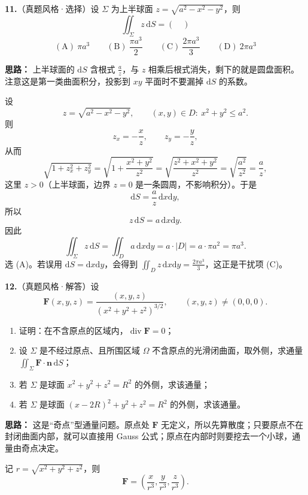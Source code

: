 \else \answerarea[8] \fi%

\textbf{11.}（真题风格·选择）设 $\Sigma$ 为上半球面 $z=\sqrt{a^2-x^2-y^2}$，则
\[
\iint_\Sigma z\,\mathrm{d}S=(\quad)
\]
\[
\mathrm{(A)}\ \pi a^3
\qquad
\mathrm{(B)}\ \frac{\pi a^3}{2}
\qquad
\mathrm{(C)}\ \frac{2\pi a^3}{3}
\qquad
\mathrm{(D)}\ 2\pi a^3
\]

\ifshowsolutions%
\textbf{思路：} 上半球面的 $\mathrm{d}S$ 含根式 $\frac{a}{z}$，与 $z$ 相乘后根式消失，剩下的就是圆盘面积。注意这是第一类曲面积分，投影到 $xy$ 平面时不要漏掉 $\mathrm{d}S$ 的系数。

设
\[
z=\sqrt{a^2-x^2-y^2},\qquad (x,y)\in D:\ x^2+y^2\le a^2.
\]
则
\[
z_x=-\frac{x}{z},\qquad z_y=-\frac{y}{z},
\]
从而
\[
\sqrt{1+z_x^2+z_y^2}
=\sqrt{1+\frac{x^2+y^2}{z^2}}
=\sqrt{\frac{z^2+x^2+y^2}{z^2}}
=\sqrt{\frac{a^2}{z^2}}
=\frac{a}{z},
\]
这里 $z>0$（上半球面，边界 $z=0$ 是一条圆周，不影响积分）。于是
\[
\mathrm{d}S=\frac{a}{z}\,\mathrm{d}x\mathrm{d}y,
\]
所以
\[
z\,\mathrm{d}S=a\,\mathrm{d}x\mathrm{d}y.
\]
因此
\[
\iint_\Sigma z\,\mathrm{d}S
=\iint_D a\,\mathrm{d}x\mathrm{d}y
=a\cdot |D|
=a\cdot\pi a^2
=\pi a^3.
\]
选 (A)。若误用 $\mathrm{d}S=\mathrm{d}x\mathrm{d}y$，会得到 $\iint_D z\,\mathrm{d}x\mathrm{d}y=\frac{2\pi a^3}{3}$，这正是干扰项 (C)。


\else \answerarea[8] \fi%

\textbf{12.}（真题风格·解答）设
\[
\mathbf F(x,y,z)=\frac{(x,y,z)}{(x^2+y^2+z^2)^{3/2}},
\qquad (x,y,z)\ne(0,0,0).
\]
\begin{enumerate}
  \item[(1)] 证明：在不含原点的区域内，$\operatorname{div}\mathbf F=0$；
  \item[(2)] 设 $\Sigma$ 是不经过原点、且所围区域 $\Omega$ 不含原点的光滑闭曲面，取外侧，求通量 $\displaystyle\iint_\Sigma \mathbf F\cdot\mathbf n\,\mathrm{d}S$；
  \item[(3)] 若 $\Sigma$ 是球面 $x^2+y^2+z^2=R^2$ 的外侧，求该通量；
  \item[(4)] 若 $\Sigma$ 是球面 $(x-2R)^2+y^2+z^2=R^2$ 的外侧，求该通量。
\end{enumerate}

\ifshowsolutions%
\textbf{思路：} 这是“奇点”型通量问题。原点处 $\mathbf F$ 无定义，所以先算散度；只要原点不在封闭曲面内部，就可以直接用 Gauss 公式；原点在内部时则要挖去一个小球，通量由奇点决定。

记 $r=\sqrt{x^2+y^2+z^2}$，则
\[
\mathbf F=\left(\frac{x}{r^3},\frac{y}{r^3},\frac{z}{r^3}\right).
\]

